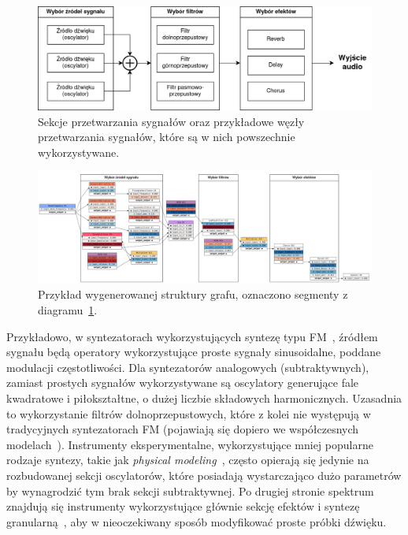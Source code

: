 \begin{figure}[H]
    \centering
    \includegraphics[width=0.8\linewidth]{rys06/synth_architecture.png}
    \caption{
      Sekcje przetwarzania sygnałów oraz przykładowe węzły przetwarzania
      sygnałów, które są w nich powszechnie wykorzystywane.
    }\label{fig:synth_architecture_diagram}
\end{figure}

\begin{figure}
    \centering
    \includegraphics[angle=90, width=0.5\linewidth]{rys06/example_generated_graph.png}
    \caption{
      Przykład wygenerowanej struktury grafu, oznaczono segmenty z diagramu~\ref{fig:synth_architecture_diagram}.
    }\label{fig:example_generated_graph}
\end{figure}


Przykładowo, w syntezatorach wykorzystujących syntezę typu FM~\cite{yamaha_dx7_manual}, źródłem
sygnału będą operatory wykorzystujące proste sygnały sinusoidalne, poddane modulacji częstotliwości.
Dla syntezatorów analogowych (subtraktywnych), zamiast prostych sygnałów wykorzystywane są
oscylatory generujące fale kwadratowe i piłokształtne, o dużej liczbie składowych harmonicznych.
Uzasadnia to wykorzystanie filtrów dolnoprzepustowych, które z kolei nie występują w tradycyjnych
syntezatorach FM (pojawiają się dopiero we współczesnych modelach~\cite{digitone_manual}).
Instrumenty eksperymentalne, wykorzystujące mniej popularne rodzaje syntezy, takie jak
\textit{physical modeling}~\cite{yamaha_vl1_manual}, często opierają się jedynie na rozbudowanej
sekcji oscylatorów, które posiadają wystarczająco dużo parametrów by wynagrodzić tym brak
sekcji subtraktywnej. Po drugiej stronie spektrum znajdują się instrumenty wykorzystujące
głównie sekcję efektów i syntezę granularną~\cite{microcosm_hologram_manual},
aby w nieoczekiwany sposób modyfikować proste próbki dźwięku.

